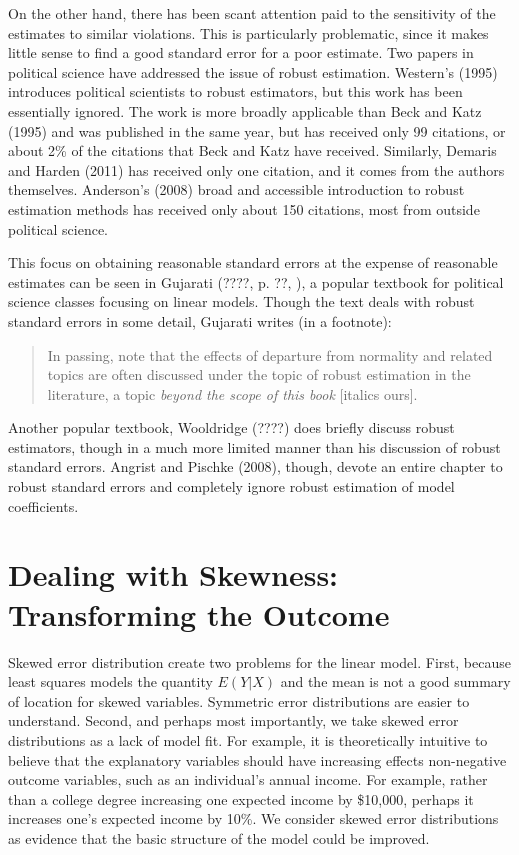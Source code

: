 \documentclass[10pt]{article}
\begin{document}
On the other hand, there has been scant attention paid to the sensitivity of the estimates to similar violations. This is particularly problematic, since it makes little sense to find a good standard error for a poor estimate. Two papers in political science have addressed the issue of robust estimation. Western's (1995) introduces political scientists to robust estimators, but this work has been essentially ignored. The work is more broadly applicable than Beck and Katz (1995) and was published in the same year, but has received only 99 citations, or  about 2\% of the citations that Beck and Katz have received. Similarly, Demaris and Harden (2011) has received only one citation, and it comes from the authors themselves. Anderson's (2008) broad and accessible introduction to robust estimation methods has received only about 150 citations, most from outside political science.

This focus on obtaining reasonable standard errors at the expense of reasonable estimates can be seen in Gujarati (????, p. ??, ), a popular textbook for political science classes focusing on linear models. Though the text deals with robust standard errors in some detail, Gujarati writes (in a footnote):
\begin{quote}
In passing, note that the effects of departure from normality and related topics are often discussed under the topic of robust estimation in the literature, a topic \textit{beyond the scope of this book} [italics ours].
\end{quote}
Another popular textbook, Wooldridge (????) does briefly discuss robust estimators, though in a much more limited manner than his discussion of robust standard errors. Angrist and Pischke (2008), though, devote an entire chapter to robust standard errors and completely ignore robust estimation of model coefficients.

\section*{Dealing with Skewness: Transforming the Outcome}

Skewed error distribution create two problems for the linear model. First, because least squares models the quantity $E(Y | X)$ and the mean is not a good summary of location for skewed variables. Symmetric error distributions are easier to understand. Second, and perhaps most importantly, we take skewed error distributions as a lack of model fit. For example, it is theoretically intuitive to believe that the explanatory variables should have increasing effects non-negative outcome variables, such as an individual's annual income. For example, rather than a college degree increasing one expected income by \$10,000, perhaps it increases one's expected income by 10\%. We consider skewed error distributions as evidence that the basic structure of the model could be improved.
\end{document}
